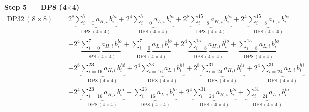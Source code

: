 \documentclass[fleqn]{article}
\newcommand{\DPop}[3]{\mathrm{DP#1}\,(#2\!\times\!#3)}
\begin{document}
\textbf{Step 5 --- DP8 (4$\times$4)}
\begin{align*}
\DPop{32}{8}{8} = {}
  & 2^{8}\underbrace{\sum_{i=0}^{7} a_{H,i}\, b_i^{hi}}_{\DPop{8}{4}{4}}
  + 2^{4}\underbrace{\sum_{i=0}^{7} a_{L,i}\, b_i^{hi}}_{\DPop{8}{4}{4}}
  + 2^{8}\underbrace{\sum_{i=8}^{15} a_{H,i}\, b_i^{hi}}_{\DPop{8}{4}{4}}
  + 2^{4}\underbrace{\sum_{i=8}^{15} a_{L,i}\, b_i^{hi}}_{\DPop{8}{4}{4}} \\[0.6em]
  & + 2^{4}\underbrace{\sum_{i=0}^{7} a_{H,i}\, b_i^{lo}}_{\DPop{8}{4}{4}}
  + \underbrace{\sum_{i=0}^{7} a_{L,i}\, b_i^{lo}}_{\DPop{8}{4}{4}}
  + 2^{4}\underbrace{\sum_{i=8}^{15} a_{H,i}\, b_i^{lo}}_{\DPop{8}{4}{4}}
  + \underbrace{\sum_{i=8}^{15} a_{L,i}\, b_i^{lo}}_{\DPop{8}{4}{4}} \\[0.6em]
  & + 2^{8}\underbrace{\sum_{i=16}^{23} a_{H,i}\, b_i^{hi}}_{\DPop{8}{4}{4}}
  + 2^{4}\underbrace{\sum_{i=16}^{23} a_{L,i}\, b_i^{hi}}_{\DPop{8}{4}{4}}
  + 2^{8}\underbrace{\sum_{i=24}^{31} a_{H,i}\, b_i^{hi}}_{\DPop{8}{4}{4}}
  + 2^{4}\underbrace{\sum_{i=24}^{31} a_{L,i}\, b_i^{hi}}_{\DPop{8}{4}{4}} \\[0.6em]
  & + 2^{4}\underbrace{\sum_{i=16}^{23} a_{H,i}\, b_i^{lo}}_{\DPop{8}{4}{4}}
  + \underbrace{\sum_{i=16}^{23} a_{L,i}\, b_i^{lo}}_{\DPop{8}{4}{4}}
  + 2^{4}\underbrace{\sum_{i=24}^{31} a_{H,i}\, b_i^{lo}}_{\DPop{8}{4}{4}}
  + \underbrace{\sum_{i=24}^{31} a_{L,i}\, b_i^{lo}}_{\DPop{8}{4}{4}}
\end{align*}
\end{document}
